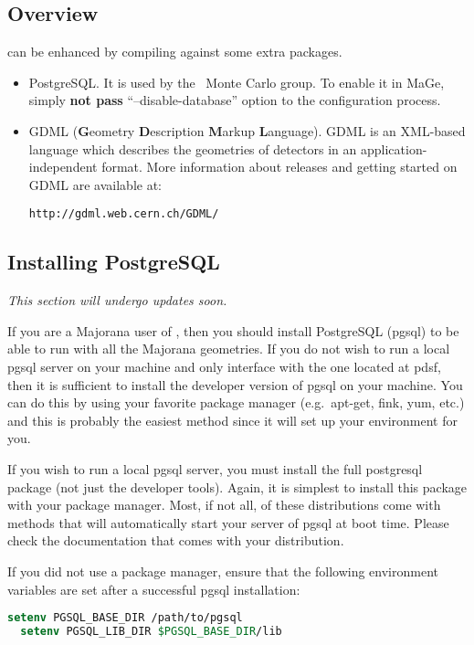 \subsection{Overview}
\mage can be enhanced by compiling against some extra packages.
\begin{itemize}
\item PostgreSQL. It is used by the \majorana \ Monte Carlo group. To
  enable it in MaGe, simply \textbf{not pass} ``--disable-database''
  option to the configuration process.
\item GDML (\textbf{G}eometry \textbf{D}escription \textbf{M}arkup
  \textbf{L}anguage). GDML is an XML-based language which describes
  the geometries of detectors in an application-independent format.
  More information about releases and getting started on GDML are available at:
\begin{lstlisting}
http://gdml.web.cern.ch/GDML/
\end{lstlisting}
\end{itemize}

\subsection{Installing PostgreSQL}
\emph{This section will undergo updates soon.} %

If you are a Majorana user of \mage, then you should install PostgreSQL
(pgsql) to be able to run with all the Majorana geometries.  If you do
not wish to run a local pgsql server on your machine and only
interface with the one located at pdsf, then it is sufficient to
install the developer version of pgsql on your machine.  You can do
this by using your favorite package manager (e.g.~apt-get, fink, yum,
etc.)  and this is probably the easiest method since it will set up
your environment for you.

If you wish to run a local pgsql server, you must install the full
postgresql package (not just the developer tools).  Again, it is
simplest to install this package with your package manager.  Most, if
not all, of these distributions come with methods that will
automatically start your server of pgsql at boot time.  Please check
the documentation that comes with your distribution.
 
If you did not use a package manager, ensure that the following
environment variables are set after a successful pgsql installation:

\begin{lstlisting}[language=csh]
  setenv PGSQL_BASE_DIR /path/to/pgsql
  setenv PGSQL_LIB_DIR $PGSQL_BASE_DIR/lib
\end{lstlisting}

